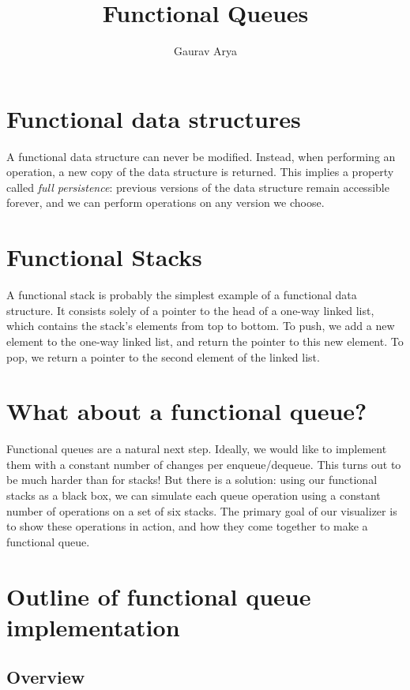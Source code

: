 \documentclass[12.5pt]{scrartcl}
\author{Gaurav Arya}
\title{Functional Queues}
\begin{document}
\maketitle

\section{Functional data structures}

A functional data structure can never be modified. Instead, when performing an operation, a new copy of the data structure is returned. This implies a property called \emph{full persistence}: previous versions of the data structure remain accessible forever, and we can perform operations on any version we choose.

\section{Functional Stacks}

A functional stack is probably the simplest example of a functional data structure. It consists solely of a pointer to the head of a one-way linked list, which contains the stack’s elements from top to bottom. To push, we add a new element to the one-way linked list, and return the pointer to this new element. To pop, we return a pointer to the second element of the linked list.

\section{What about a functional queue?}

Functional queues are a natural next step. Ideally, we would like to implement them with a constant number of changes per enqueue/dequeue. This turns out to be much harder than for stacks! But there is a solution: using our functional stacks as a black box, we can simulate each queue operation using a constant number of operations on a set of six stacks. The primary goal of our visualizer is to show these operations in action, and how they come together to make a functional queue.

\section{Outline of functional queue implementation}

\subsection{Overview}
\end{document}
